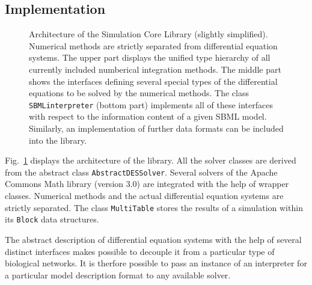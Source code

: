 \documentclass{bioinfo}
\newcommand{\AbstractDESSolver}{\texttt{Abstract\-DES\-Solver}}
\newcommand{\SBMLinterpreter}{\texttt{SBML\-interpreter}}
\newcommand{\MultiTable}{\texttt{Multi\-Table}}
\newcommand{\Block}{\texttt{Block}}
\begin{document}
\begin{methods}
\section{Implementation}
\begin{figure}
\caption[Architecture of the Simulation Core Library]{Architecture of
the Simulation Core Library (slightly simplified). Numerical methods are
strictly separated from differential equation systems. The upper part displays
the unified type hierarchy of all currently included numberical integration
methods. The middle part shows the interfaces defining several
special types of the differential equations to be solved by the numerical
methods.
The class \SBMLinterpreter{} (bottom part) implements all of these interfaces
with respect to the information content of a given SBML model. Similarly, an
implementation of further data formats can be included into the library.}
\label{fig:Architecture}
\end{figure}
Fig.~\ref{fig:Architecture} displays the architecture of the library. All the
solver classes are derived from the abstract class \AbstractDESSolver.
Several solvers of the Apache Commons Math library (version 3.0) are integrated
with the help of wrapper classes. Numerical methods and the actual differential
equation systems are strictly separated. The class \MultiTable{} stores the
results of a simulation within its \Block{} data structures. 

The abstract description of differential equation systems with the help of
several distinct interfaces makes possible to decouple it from a particular type
of biological networks. It is therfore possible to pass an instance of an
interpreter for a particular model description format to any
available solver.


\end{methods}
\end{document}
